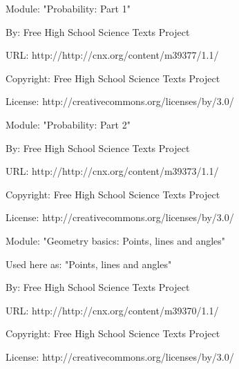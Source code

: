       \par\vspace{9pt}\noindent\begin{minipage}{\textwidth}
      Module: "Probability: Part 1" \par\nopagebreak\noindent
      By: Free High School Science Texts Project\par\nopagebreak\noindent
      URL: http://http://cnx.org/content/m39377/1.1/\par\nopagebreak\noindent
      \par\nopagebreak\noindent
      Copyright: Free High School Science Texts Project\par\nopagebreak\noindent
      License:  http://creativecommons.org/licenses/by/3.0/\par\nopagebreak\noindent
      \par\end{minipage}
      \par\vspace{9pt}\noindent\begin{minipage}{\textwidth}
      Module: "Probability: Part 2" \par\nopagebreak\noindent
      By: Free High School Science Texts Project\par\nopagebreak\noindent
      URL: http://http://cnx.org/content/m39373/1.1/\par\nopagebreak\noindent
      \par\nopagebreak\noindent
      Copyright: Free High School Science Texts Project\par\nopagebreak\noindent
      License:  http://creativecommons.org/licenses/by/3.0/\par\nopagebreak\noindent
      \par\end{minipage}
      \par\vspace{9pt}\noindent\begin{minipage}{\textwidth}
      Module: "Geometry basics: Points, lines and angles" \par\nopagebreak\noindent
      Used here as: "Points, lines and angles" \par\nopagebreak\noindent
        By: Free High School Science Texts Project\par\nopagebreak\noindent
      URL: http://http://cnx.org/content/m39370/1.1/\par\nopagebreak\noindent
      \par\nopagebreak\noindent
      Copyright: Free High School Science Texts Project\par\nopagebreak\noindent
      License:  http://creativecommons.org/licenses/by/3.0/\par\nopagebreak\noindent
      \par\end{minipage}
